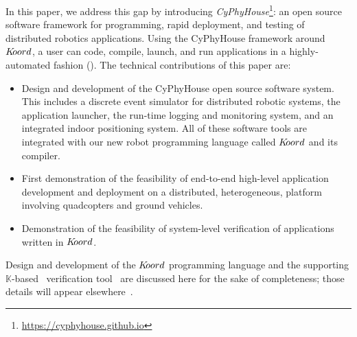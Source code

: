 In this paper, we address this gap by introducing {\em CyPhyHouse}\footnote{\href{https://cyphyhouse.github.io/index.html}{https://cyphyhouse.github.io}}: an open source software framework for programming, rapid deployment, and testing of distributed robotics applications. 
Using the CyPhyHouse framework around $K\kern-2pt oord$, a user can code, compile, launch, and run applications in a highly-automated fashion (). 
%
%
The technical contributions of this paper are:
\begin{itemize}
\item Design and development of the CyPhyHouse open source software system. This includes a discrete event simulator for distributed robotic systems, the application launcher, the run-time logging and monitoring system, and an integrated indoor positioning system. All of these software tools are integrated with our new robot programming language called $K\kern-2pt oord$ and its compiler. 
\item First demonstration of the feasibility of end-to-end high-level application development and deployment on a distributed, heterogeneous, platform involving quadcopters and ground vehicles. 
\item Demonstration of the feasibility of system-level verification of applications written in $K\kern-2pt oord$. 
\end{itemize}
Design and development of the $K\kern-2pt oord$ programming language and the supporting $\mathbb{K}$-based~\cite{Kpaper} verification tool \kbmc\, are discussed here for the sake of completeness; those details will appear elsewhere~\cite{koordreport}.


